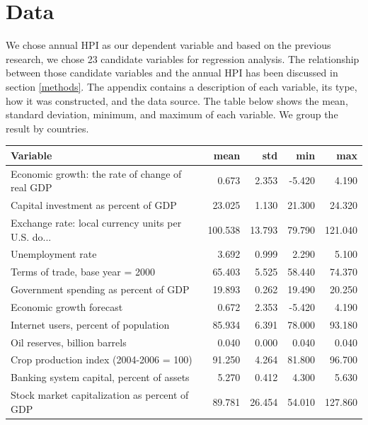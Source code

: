 \documentclass[11pt]{article}
\begin{document}
\section{Data}\label{data}
We chose annual HPI as our dependent variable and based on the previous research, we chose 23 candidate variables for regression analysis. The relationship between those candidate variables and the annual HPI has been discussed in section \ref{methods}. The appendix contains a description of each variable, its type, how it was constructed, and the data source. The table below shows the mean, standard deviation, minimum, and maximum of each variable. We group the result by countries.
\begin{table}[H]
\begin{tabular}{lrrrr}
\toprule
{} Variable&        mean &        std &         min &         max \\
\midrule
Economic growth: the rate of change of real GDP    &       0.673 &      2.353 &      -5.420 &       4.190 \\
Capital investment as percent of GDP               &      23.025 &      1.130 &      21.300 &      24.320 \\
Exchange rate: local currency units per U.S. do... &     100.538 &     13.793 &      79.790 &     121.040 \\
Unemployment rate                                  &       3.692 &      0.999 &       2.290 &       5.100 \\
Terms of trade, base year = 2000                   &      65.403 &      5.525 &      58.440 &      74.370 \\
Government spending as percent of GDP              &      19.893 &      0.262 &      19.490 &      20.250 \\
Economic growth forecast                           &       0.672 &      2.353 &      -5.420 &       4.190 \\
Internet users, percent of population              &      85.934 &      6.391 &      78.000 &      93.180 \\
Oil reserves, billion barrels                      &       0.040 &      0.000 &       0.040 &       0.040 \\
Crop production index (2004-2006 = 100)            &      91.250 &      4.264 &      81.800 &      96.700 \\
Banking system capital, percent of assets          &       5.270 &      0.412 &       4.300 &       5.630 \\
Stock market capitalization as percent of GDP      &      89.781 &     26.454 &      54.010 &     127.860 \\

\end{tabular}
\end{table}
\end{document}
